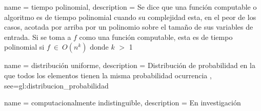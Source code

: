 {
  name = tiempo polinomial,
  description = {
    Se dice que una función computable o algoritmo es de tiempo polinomial 
    cuando su complejidad esta, en el peor de los casos, acotada por arriba 
    por un polinomio sobre el tamaño de sus variables de entrada.
    Si se toma a $f$ como una función computable, esta es de tiempo 
    polinomial si $f\: \in\: O(n^k)$ donde $k$ $>$ 1%
  }
}

{
  name = distribución uniforme,
  description = {
    Distribución de probabilidad en la que todos los elementos tienen la misma
    probabilidad ocurrencia%
  },
  see={gl:distribucion_probabilidad}
}

{
  name = computacionalmente indistinguible,
  description = {En investigación%
  }
}

\glsaddall
